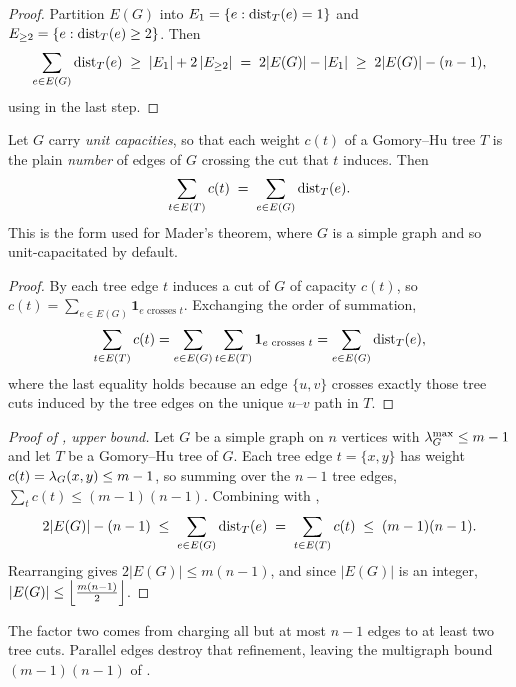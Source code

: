 \begin{proof}
Partition $E(G)$ into $E_1 = \{e : \operatorname{dist}_T(e) = 1\}$ and $E_{\ge 2} = \{e : \operatorname{dist}_T(e) \ge 2\}$. Then
\[
\sum_{e \in E(G)} \operatorname{dist}_T(e) \;\ge\; |E_1| + 2\,|E_{\ge 2}| \;=\; 2|E(G)| - |E_1| \;\ge\; 2|E(G)| - (n-1),
\]
using  in the last step.
\end{proof}

\begin{lemma}\label{lem:double-count}
Let $G$ carry \emph{unit capacities}, so that each weight $c(t)$ of a Gomory--Hu tree $T$ is the plain \emph{number} of edges of $G$ crossing the cut that $t$ induces. Then
\[
    \sum_{t \in E(T)} c(t) \;=\; \sum_{e \in E(G)} \operatorname{dist}_T(e).
\]
This is the form used for Mader's theorem, where $G$ is a simple graph and so unit-capacitated by default.
\end{lemma}

\begin{proof}
By  each tree edge $t$ induces a cut of $G$ of capacity $c(t)$, so $c(t) = \sum_{e \in E(G)} \mathbf{1}_{e \text{ crosses } t}$. Exchanging the order of summation,
\[
\sum_{t \in E(T)} c(t) = \sum_{e \in E(G)} \sum_{t \in E(T)} \mathbf{1}_{e \text{ crosses } t} = \sum_{e \in E(G)} \operatorname{dist}_T(e),
\]
where the last equality holds because an edge $\{u,v\}$ crosses exactly those tree cuts induced by the tree edges on the unique $u$--$v$ path in $T$.
\end{proof}

\begin{proof}[Proof of , upper bound]
Let $G$ be a simple graph on $n$ vertices with $\lambda^{\max}_G \le m-1$ and let $T$ be a Gomory--Hu tree of $G$. Each tree edge $t = \{x, y\}$ has weight $c(t) = \lambda_G(x, y) \le m-1$, so summing over the $n-1$ tree edges, $\sum_{t} c(t) \le (m-1)(n-1)$. Combining with ,
\[
2|E(G)| - (n-1) \;\le\; \sum_{e \in E(G)} \operatorname{dist}_T(e) \;=\; \sum_{t \in E(T)} c(t) \;\le\; (m-1)(n-1).
\]
Rearranging gives $2|E(G)| \le m(n-1)$, and since $|E(G)|$ is an integer, $|E(G)| \le \left\lfloor \frac{m(n-1)}{2} \right\rfloor$.
\end{proof}

The factor two comes from charging all but at most $n-1$ edges to at least two tree cuts. Parallel edges destroy that refinement, leaving the multigraph bound $(m-1)(n-1)$ of .

